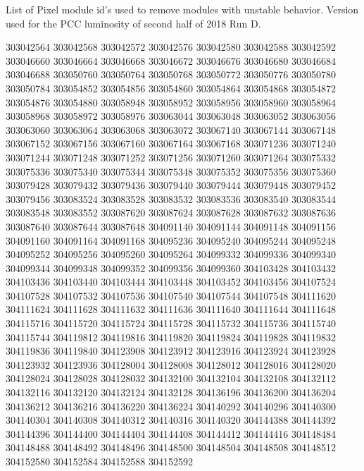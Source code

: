 
List of Pixel module id's used to remove modules with unstable behavior. Version used for the PCC luminosity of second half of 2018 Run D. 

{
\tiny
 303042564
 303042568
 303042572
 303042576
 303042580
 303042588
 303042592
 303046660
 303046664
 303046668
 303046672
 303046676
 303046680
 303046684
 303046688
 303050760
 303050764
 303050768
 303050772
 303050776
 303050780
 303050784
 303054852
 303054856
 303054860
 303054864
 303054868
 303054872
 303054876
 303054880
 303058948
 303058952
 303058956
 303058960
 303058964
 303058968
 303058972
 303058976
 303063044
 303063048
 303063052
 303063056
 303063060
 303063064
 303063068
 303063072
 303067140
 303067144
 303067148
 303067152
 303067156
 303067160
 303067164
 303067168
 303071236
 303071240
 303071244
 303071248
 303071252
 303071256
 303071260
 303071264
 303075332
 303075336
 303075340
 303075344
 303075348
 303075352
 303075356
 303075360
 303079428
 303079432
 303079436
 303079440
 303079444
 303079448
 303079452
 303079456
 303083524
 303083528
 303083532
 303083536
 303083540
 303083544
 303083548
 303083552
 303087620
 303087624
 303087628
 303087632
 303087636
 303087640
 303087644
 303087648
 304091140
 304091144
 304091148
 304091156
 304091160
 304091164
 304091168
 304095236
 304095240
 304095244
 304095248
 304095252
 304095256
 304095260
 304095264
 304099332
 304099336
 304099340
 304099344
 304099348
 304099352
 304099356
 304099360
 304103428
 304103432
 304103436
 304103440
 304103444
 304103448
 304103452
 304103456
 304107524
 304107528
 304107532
 304107536
 304107540
 304107544
 304107548
 304111620
 304111624
 304111628
 304111632
 304111636
 304111640
 304111644
 304111648
 304115716
 304115720
 304115724
 304115728
 304115732
 304115736
 304115740
 304115744
 304119812
 304119816
 304119820
 304119824
 304119828
 304119832
 304119836
 304119840
 304123908
 304123912
 304123916
 304123924
 304123928
 304123932
 304123936
 304128004
 304128008
 304128012
 304128016
 304128020
 304128024
 304128028
 304128032
 304132100
 304132104
 304132108
 304132112
 304132116
 304132120
 304132124
 304132128
 304136196
 304136200
 304136204
 304136212
 304136216
 304136220
 304136224
 304140292
 304140296
 304140300
 304140304
 304140308
 304140312
 304140316
 304140320
 304144388
 304144392
 304144396
 304144400
 304144404
 304144408
 304144412
 304144416
 304148484
 304148488
 304148492
 304148496
 304148500
 304148504
 304148508
 304148512
 304152580
 304152584
 304152588
 304152592
}
